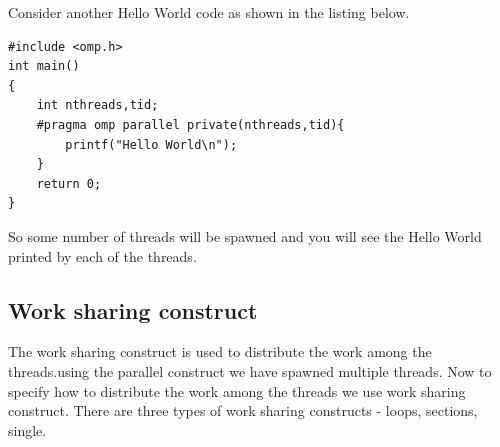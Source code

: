 \documentclass[12pt]{article}
\begin{document}
Consider another Hello World code as shown in the listing below.
\begin{lstlisting}
#include <omp.h>
int main()
{
    int nthreads,tid;
    #pragma omp parallel private(nthreads,tid){
        printf("Hello World\n");
    }
    return 0;
}
\end{lstlisting}
So some number of threads will be spawned and you will see the Hello World printed by each of the threads.

\subsection{Work sharing construct}
The work sharing construct is used to distribute the work among the threads.using the parallel construct we have spawned multiple threads.
Now to specify how to distribute the work among the threads we use work sharing construct.
There are three types of work sharing constructs - loops, sections, single.
\end{document}
